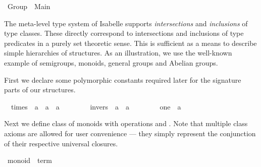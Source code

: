 %
\begin{isabellebody}%
\def\isabellecontext{Group}%
%
\isamarkuptrue%
\ Group\ {\isacharequal}\ Main{\isacharcolon}\isamarkupfalse%
%
\begin{isamarkuptext}%
\medskip\noindent The meta-level type system of Isabelle supports
 \emph{intersections} and \emph{inclusions} of type classes. These
 directly correspond to intersections and inclusions of type
 predicates in a purely set theoretic sense. This is sufficient as a
 means to describe simple hierarchies of structures.  As an
 illustration, we use the well-known example of semigroups, monoids,
 general groups and Abelian groups.%
\end{isamarkuptext}%
\isamarkuptrue%
%
\isamarkuptrue%
%
\begin{isamarkuptext}%
First we declare some polymorphic constants required later for the
 signature parts of our structures.%
\end{isamarkuptext}%
\isamarkuptrue%
\isanewline
\ \ times\ {\isacharcolon}{\isacharcolon}\ {\isachardoublequote}{\isacharprime}a\ {\isasymRightarrow}\ {\isacharprime}a\ {\isasymRightarrow}\ {\isacharprime}a{\isachardoublequote}\ \ \ \ {\isacharparenleft}\ {\isachardoublequote}{\isasymodot}{\isachardoublequote}\ {}{}{\isacharparenright}\isanewline
\ \ invers\ {\isacharcolon}{\isacharcolon}\ {\isachardoublequote}{\isacharprime}a\ {\isasymRightarrow}\ {\isacharprime}a{\isachardoublequote}\ \ \ \ {\isacharparenleft}{\isachardoublequote}{\isacharparenleft}{\isacharunderscore}{\isasyminv}{\isacharparenright}{\isachardoublequote}\ {\isacharbrackleft}{}{}{}{}{\isacharbrackright}\ {}{}{}{\isacharparenright}\isanewline
\ \ one\ {\isacharcolon}{\isacharcolon}\ {\isacharprime}a\ \ \ \ {\isacharparenleft}{\isachardoublequote}{\isasymunit}{\isachardoublequote}{\isacharparenright}\isamarkupfalse%
%
\begin{isamarkuptext}%
\noindent Next we define class  of monoids with
 operations \isa{{\isasymodot}} and \isa{{\isasymunit}}.  Note that multiple class
 axioms are allowed for user convenience --- they simply represent the
 conjunction of their respective universal closures.%
\end{isamarkuptext}%
\isamarkuptrue%
\ monoid\ {\isasymsubseteq}\ {\isachardoublequote}term{\isachardoublequote}\isanewline

\end{isabellebody}
